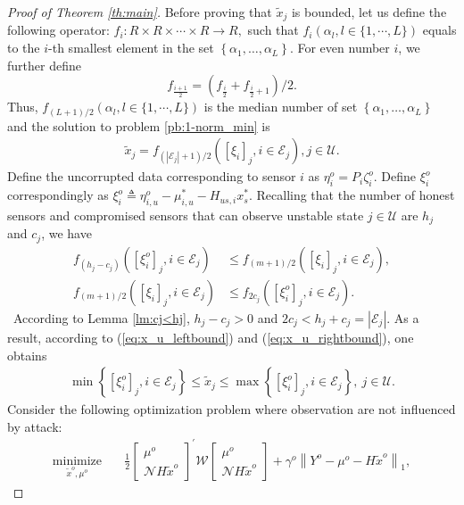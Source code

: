 \documentclass[12pt]{article}  %
\newcommand{\Ec}{{\mathcal{E}}} %
\newcommand{\Uc}{{\mathcal{U}}}
\newcommand{\Nc}{{\mathcal{N}}}
\newcommand{\Wc}{{\mathcal{W}}}
\newtheorem*{proof}{\textbf{Proof}}
\begin{document}
\begin{proof}[Proof of Theorem \ref{th:main}]
	Before proving that $\tilde{x}_j$ is bounded, let us define the following operator: $f_{i}: R \times R \times \cdots \times R \rightarrow R,$ such that $f_{i}\left(\alpha_{l}, l\in\{1,\cdots,L\}\right)$ equals to the $i$-th smallest element in the set $\left\{\alpha_{1}, \ldots, \alpha_{L}\right\} .$ For even number $i$, we further define 
	$$f_{\frac{i+1}{2}} = \left(f_{\frac{i}{2}} + f_{\frac{i}{2}+1}\right)/2.$$ 
	Thus, $f_{(L+1)/2}\left(\alpha_{l}, l\in\{1,\cdots,L\}\right)$ is the median number of set $\left\{\alpha_{1}, \ldots, \alpha_{L}\right\}$ and the solution to problem \eqref{pb:1-norm_min} is 
	\begin{align*}
	\tilde{x}_j = f_{(|\Ec_j|+1)/2}\left([\xi_i]_j, i\in\Ec_j\right),j\in\Uc .
	\end{align*}
	Define the uncorrupted data corresponding to sensor $i$ as $\eta^o_{i}=P_i\zeta^o_i$. Define $\xi^o_{i}$ correspondingly as $\xi^o_i\triangleq \eta^o_{i,u}-\mu^*_{i,u}- H_{us,i} x^*_s $.
	Recalling that the number of honest sensors and compromised sensors that can observe unstable state $j\in\Uc$ are $h_j$ and $c_j$, we have
	\begin{align}	
	f_{(h_j-c_j)}\left([\xi^o_i]_j, i\in\Ec_j\right) &\leq
	f_{(m+1)/2}\left([\xi_i]_j, i\in\Ec_j\right), \label{eq:x_u_leftbound}\\
	f_{(m+1)/2}\left([\xi_i]_j, i\in\Ec_j\right)&\leq 
	f_{2c_j}\left([\xi^o_i]_j, i\in\Ec_j\right) .  \label{eq:x_u_rightbound}
	\end{align}\	According to Lemma \ref{lm:cj<hj}, $h_j-c_j>0$ and $2c_j<h_j+c_j=|\Ec_j|$.
	As a result, according to (\ref{eq:x_u_leftbound}) and (\ref{eq:x_u_rightbound}), one obtains
	\begin{align}\label{eq:med_bound}
	\min \left\{ [\xi^o_i]_j, i\in\Ec_j \right\}\leq \tilde{x}_j\leq \max \left\{ [\xi^o_i]_j, i\in\Ec_j \right\},\ j\in\Uc .
	\end{align}
	Consider the following optimization problem where observation are not influenced by attack:
	\begin{align*}
	\underset{{\tilde{x}}^o,\mu^o}{\text{minimize}}&\quad \frac{1}{2} 
	\begin{bmatrix}
	\mu^o \\
	\Nc H \tilde{x}^o
	\end{bmatrix}^{'} \Wc
	\begin{bmatrix}
	\mu^o \\
	\Nc H \tilde{x}^o
	\end{bmatrix} + \gamma^o\left\|{Y}^o-\mu^o-H \tilde{x}^o\right\|_1 ,
	\end{align*}

\end{proof}
\end{document}
